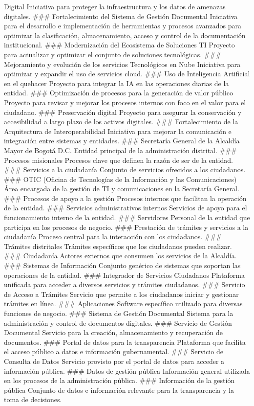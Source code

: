 \documentclass[
	a4paper, %
	12pt, %
]{include/CSSullivanBusinessReport}
\begin{document}
Digital Iniciativa para proteger la infraestructura y los datos de
amenazas digitales. \#\#\# Fortalecimiento del Sistema de Gestión
Documental Iniciativa para el desarrollo e implementación de
herramientas y procesos avanzados para optimizar la clasificación,
almacenamiento, acceso y control de la documentación institucional.
\#\#\# Modernización del Ecosistema de Soluciones TI Proyecto para
actualizar y optimizar el conjunto de soluciones tecnológicas. \#\#\#
Mejoramiento y evolución de los servicios Tecnológicos en Nube
Iniciativa para optimizar y expandir el uso de servicios cloud. \#\#\#
Uso de Inteligencia Artificial en el quehacer Proyecto para integrar la
IA en las operaciones diarias de la entidad. \#\#\# Optimización de
procesos para la generación de valor público Proyecto para revisar y
mejorar los procesos internos con foco en el valor para el ciudadano.
\#\#\# Preservación digital Proyecto para asegurar la conservación y
accesibilidad a largo plazo de los activos digitales. \#\#\#
Fortalecimiento de la Arquitectura de Interoperabilidad Iniciativa para
mejorar la comunicación e integración entre sistemas y entidades. \#\#\#
Secretaría General de la Alcaldía Mayor de Bogotá D.C. Entidad principal
de la administración distrital. \#\#\# Procesos misionales Procesos
clave que definen la razón de ser de la entidad. \#\#\# Servicios a la
ciudadanía Conjunto de servicios ofrecidos a los ciudadanos. \#\#\# OTIC
(Oficina de Tecnologías de la Información y las Comunicaciones) Área
encargada de la gestión de TI y comunicaciones en la Secretaría General.
\#\#\# Procesos de apoyo a la gestión Procesos internos que facilitan la
operación de la entidad. \#\#\# Servicios administrativos internos
Servicios de apoyo para el funcionamiento interno de la entidad. \#\#\#
Servidores Personal de la entidad que participa en los procesos de
negocio. \#\#\# Prestación de trámites y servicios a la ciudadanía
Proceso central para la interacción con los ciudadanos. \#\#\# Trámites
distritales Trámites específicos que los ciudadanos pueden realizar.
\#\#\# Ciudadanía Actores externos que consumen los servicios de la
Alcaldía. \#\#\# Sistemas de Información Conjunto genérico de sistemas
que soportan las operaciones de la entidad. \#\#\# Integrador de
Servicios Ciudadanos Plataforma unificada para acceder a diversos
servicios y trámites ciudadanos. \#\#\# Servicio de Acceso a Trámites
Servicio que permite a los ciudadanos iniciar y gestionar trámites en
línea. \#\#\# Aplicaciones Software específico utilizado para diversas
funciones de negocio. \#\#\# Sistema de Gestión Documental Sistema para
la administración y control de documentos digitales. \#\#\# Servicio de
Gestión Documental Servicio para la creación, almacenamiento y
recuperación de documentos. \#\#\# Portal de datos para la transparencia
Plataforma que facilita el acceso público a datos e información
gubernamental. \#\#\# Servicio de Consulta de Datos Servicio provisto
por el portal de datos para acceder a información pública. \#\#\# Datos
de gestión pública Información general utilizada en los procesos de la
administración pública. \#\#\# Información de la gestión pública
Conjunto de datos e información relevante para la transparencia y la
toma de decisiones.
\end{document}
